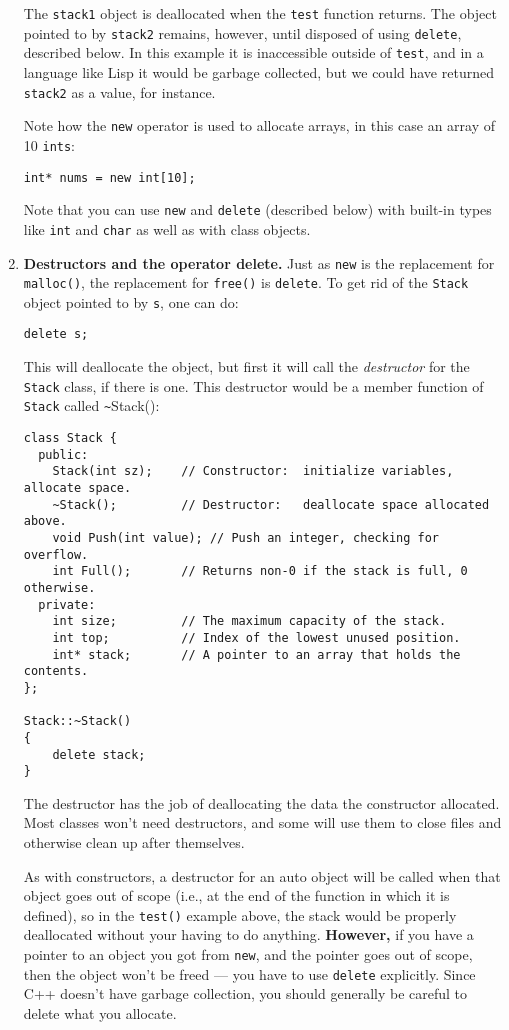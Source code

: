 \begin{enumerate}
The {\tt stack1} object is deallocated when the {\tt test} function
returns.  The object pointed to by {\tt stack2} remains, however,
until disposed of using {\tt delete}, described below.  In this
example it is inaccessible outside of {\tt test}, and in a language
like Lisp it would be garbage collected, but we could have returned
{\tt stack2} as a value, for instance.

Note how the {\tt new} operator is used to allocate arrays, in this
case an array of 10 {\tt ints}:

\begin{verbatim}
int* nums = new int[10];
\end{verbatim}

Note that you can use {\tt new} and {\tt delete} (described below)
with built-in types like {\tt int} and {\tt char} as well as with
class objects.

\item {\bf Destructors and the operator delete.}  Just as {\tt new} is the
replacement for {\tt malloc()}, the replacement for {\tt free()} is
{\tt delete}.  To get rid of the {\tt Stack} object pointed
to by {\tt s}, one can do:
\begin{verbatim}
delete s;
\end{verbatim}
This will deallocate the object, but first it will call the
{\it destructor} for the {\tt Stack} class, if there is one.  This
destructor would be a member function of {\tt Stack} called {{\verb^~^}Stack()}:
\begin{verbatim}
class Stack {
  public:
    Stack(int sz);    // Constructor:  initialize variables, allocate space.
    ~Stack();         // Destructor:   deallocate space allocated above.
    void Push(int value); // Push an integer, checking for overflow.
    int Full();       // Returns non-0 if the stack is full, 0 otherwise.
  private:
    int size;         // The maximum capacity of the stack.
    int top;          // Index of the lowest unused position.
    int* stack;       // A pointer to an array that holds the contents.
};

Stack::~Stack()
{
    delete stack;
}
\end{verbatim}
The destructor has the job of deallocating the data the constructor
allocated.  Most classes won't need destructors, and some will use
them to close files and otherwise clean up after themselves.

As with constructors, a destructor for an auto object will be called
when that object goes out of scope (i.e., at the end of the function
in which it is defined), so in the {\tt test()} example above, the
stack would be properly deallocated without your having to do
anything.  {\bf However,} if you have a pointer to an object you got
from {\tt new}, and the pointer goes out of scope, then the object
won't be freed --- you have to use {\tt delete} explicitly.  Since C++
doesn't have garbage collection, you should generally be careful to
delete what you allocate.


\end{enumerate}
